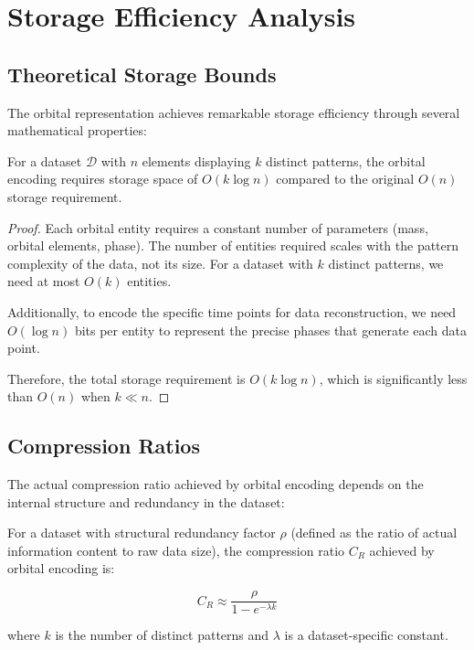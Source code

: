 \section{Storage Efficiency Analysis}

\subsection{Theoretical Storage Bounds}

The orbital representation achieves remarkable storage efficiency through several mathematical properties:

\begin{theorem}
For a dataset $\mathcal{D}$ with $n$ elements displaying $k$ distinct patterns, the orbital encoding requires storage space of $O(k \log n)$ compared to the original $O(n)$ storage requirement.
\end{theorem}

\begin{proof}
Each orbital entity requires a constant number of parameters (mass, orbital elements, phase). The number of entities required scales with the pattern complexity of the data, not its size. For a dataset with $k$ distinct patterns, we need at most $O(k)$ entities.

Additionally, to encode the specific time points for data reconstruction, we need $O(\log n)$ bits per entity to represent the precise phases that generate each data point.

Therefore, the total storage requirement is $O(k \log n)$, which is significantly less than $O(n)$ when $k \ll n$.
\end{proof}

\subsection{Compression Ratios}

The actual compression ratio achieved by orbital encoding depends on the internal structure and redundancy in the dataset:

\begin{proposition}
For a dataset with structural redundancy factor $\rho$ (defined as the ratio of actual information content to raw data size), the compression ratio $C_R$ achieved by orbital encoding is:

\begin{equation}
C_R \approx \frac{\rho}{1 - e^{-\lambda k}}
\end{equation}

where $k$ is the number of distinct patterns and $\lambda$ is a dataset-specific constant.
\end{proposition}

